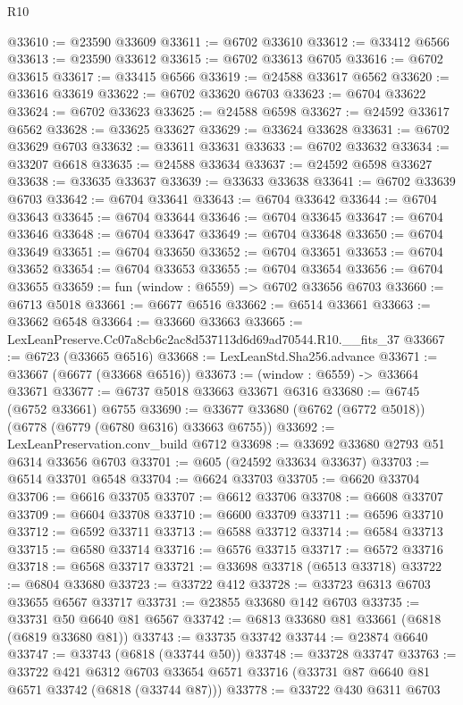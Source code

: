 \begin{lexlean}{R10}
\begin{coremodule}
@33610 := @23590 @33609
@33611 := @6702 @33610
@33612 := @33412 @6566
@33613 := @23590 @33612
@33615 := @6702 @33613 @6705
@33616 := @6702 @33615
@33617 := @33415 @6566
@33619 := @24588 @33617 @6562
@33620 := @33616 @33619
@33622 := @6702 @33620 @6703
@33623 := @6704 @33622
@33624 := @6702 @33623
@33625 := @24588 @6598
@33627 := @24592 @33617 @6562
@33628 := @33625 @33627
@33629 := @33624 @33628
@33631 := @6702 @33629 @6703
@33632 := @33611 @33631
@33633 := @6702 @33632
@33634 := @33207 @6618
@33635 := @24588 @33634
@33637 := @24592 @6598 @33627
@33638 := @33635 @33637
@33639 := @33633 @33638
@33641 := @6702 @33639 @6703
@33642 := @6704 @33641
@33643 := @6704 @33642
@33644 := @6704 @33643
@33645 := @6704 @33644
@33646 := @6704 @33645
@33647 := @6704 @33646
@33648 := @6704 @33647
@33649 := @6704 @33648
@33650 := @6704 @33649
@33651 := @6704 @33650
@33652 := @6704 @33651
@33653 := @6704 @33652
@33654 := @6704 @33653
@33655 := @6704 @33654
@33656 := @6704 @33655
@33659 := fun (window : @6559) => @6702 @33656 @6703
@33660 := @6713 @5018
@33661 := @6677 @6516
@33662 := @6514 @33661
@33663 := @33662 @6548
@33664 := @33660 @33663
@33665 := LexLeanPreserve.Cc07a8cb6c2ac8d537113d6d69ad70544.R10.__fits_37
@33667 := @6723 (@33665 @6516)
@33668 := LexLeanStd.Sha256.advance
@33671 := @33667 (@6677 (@33668 @6516))
@33673 := (window : @6559) -> @33664 @33671
@33677 := @6737 @5018 @33663 @33671 @6316
@33680 := @6745 (@6752 @33661) @6755
@33690 := @33677 @33680 (@6762 (@6772 @5018)) (@6778 (@6779 (@6780 @6316) @33663 @6755))
@33692 := LexLeanPreservation.conv_build @6712
@33698 := @33692 @33680 @2793 @51 @6314 @33656 @6703
@33701 := @605 (@24592 @33634 @33637)
@33703 := @6514 @33701 @6548
@33704 := @6624 @33703
@33705 := @6620 @33704
@33706 := @6616 @33705
@33707 := @6612 @33706
@33708 := @6608 @33707
@33709 := @6604 @33708
@33710 := @6600 @33709
@33711 := @6596 @33710
@33712 := @6592 @33711
@33713 := @6588 @33712
@33714 := @6584 @33713
@33715 := @6580 @33714
@33716 := @6576 @33715
@33717 := @6572 @33716
@33718 := @6568 @33717
@33721 := @33698 @33718 (@6513 @33718)
@33722 := @6804 @33680
@33723 := @33722 @412
@33728 := @33723 @6313 @6703 @33655 @6567 @33717
@33731 := @23855 @33680 @142 @6703
@33735 := @33731 @50 @6640 @81 @6567
@33742 := @6813 @33680 @81 @33661 (@6818 (@6819 @33680 @81))
@33743 := @33735 @33742
@33744 := @23874 @6640
@33747 := @33743 (@6818 (@33744 @50))
@33748 := @33728 @33747
@33763 := @33722
    @421
    @6312
    @6703
    @33654
    @6571
    @33716
    (@33731 @87 @6640 @81 @6571 @33742 (@6818 (@33744 @87)))
@33778 := @33722
    @430
    @6311
    @6703

\end{coremodule}
\end{lexlean}
